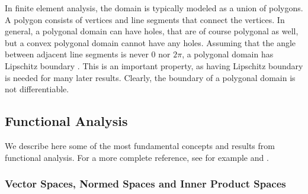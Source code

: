 \documentclass[english, 12pt, a4paper, sci, utf8, a-2b, online]{aaltothesis}
\theoremstyle{definition}
\theoremstyle{plain}
\numberwithin{equation}{section}
\begin{document}
In finite element analysis, the domain is typically modeled as a union of polygons.
A polygon consists of vertices and line segments that connect the vertices.
In general, a polygonal domain can have holes, that are of course polygonal as well,
but a convex polygonal domain cannot have any holes.
Assuming that the angle between adjacent line segments is never $0$ nor $2\pi$,
a polygonal domain has Lipschitz boundary \cite{grisvard2011}.
This is an important property, as having Lipschitz boundary is needed
for many later results.
Clearly, the boundary of a polygonal domain is not differentiable.

\subsection{Functional Analysis}
\label{subsec:functionalanalysis}

We describe here some of the most fundamental concepts and results from functional 
analysis. For a more complete reference, see for example \cite{rudin1991} and \cite{rudin1986}.

\subsubsection{Vector Spaces, Normed Spaces and Inner Product Spaces}
\label{subsubsec:normedspaces}
\end{document}
